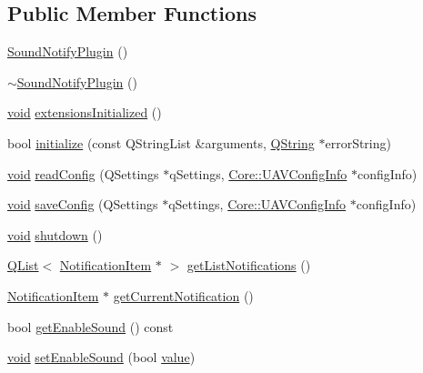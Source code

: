 \subsection*{Public Member Functions}
\begin{DoxyCompactItemize}
\item 
\hyperlink{group__notifyplugin_ga4ac47c6cde68d633ead0764296f9a737}{Sound\-Notify\-Plugin} ()
\item 
\hyperlink{group__notifyplugin_ga41104bb06fbf94801a798514294d39c3}{$\sim$\-Sound\-Notify\-Plugin} ()
\item 
\hyperlink{group___u_a_v_objects_plugin_ga444cf2ff3f0ecbe028adce838d373f5c}{void} \hyperlink{group__notifyplugin_gad704ab0c43392e54f01882f7883f689f}{extensions\-Initialized} ()
\item 
bool \hyperlink{group__notifyplugin_ga5c84bbeb8237b65ecce93f518a26384d}{initialize} (const Q\-String\-List \&arguments, \hyperlink{group___u_a_v_objects_plugin_gab9d252f49c333c94a72f97ce3105a32d}{Q\-String} $\ast$error\-String)
\item 
\hyperlink{group___u_a_v_objects_plugin_ga444cf2ff3f0ecbe028adce838d373f5c}{void} \hyperlink{group__notifyplugin_gae783274f70106d7f8a50f51b4d98221f}{read\-Config} (Q\-Settings $\ast$q\-Settings, \hyperlink{class_core_1_1_u_a_v_config_info}{Core\-::\-U\-A\-V\-Config\-Info} $\ast$config\-Info)
\item 
\hyperlink{group___u_a_v_objects_plugin_ga444cf2ff3f0ecbe028adce838d373f5c}{void} \hyperlink{group__notifyplugin_ga591d270cfaee4d5107899bf24ac83289}{save\-Config} (Q\-Settings $\ast$q\-Settings, \hyperlink{class_core_1_1_u_a_v_config_info}{Core\-::\-U\-A\-V\-Config\-Info} $\ast$config\-Info)
\item 
\hyperlink{group___u_a_v_objects_plugin_ga444cf2ff3f0ecbe028adce838d373f5c}{void} \hyperlink{group__notifyplugin_ga2f91d9771233415fa6d23a8087331df9}{shutdown} ()
\item 
\hyperlink{class_q_list}{Q\-List}$<$ \hyperlink{class_notification_item}{Notification\-Item} $\ast$ $>$ \hyperlink{group__notifyplugin_ga949c06b617fbadfd2c844d9f29351085}{get\-List\-Notifications} ()
\item 
\hyperlink{class_notification_item}{Notification\-Item} $\ast$ \hyperlink{group__notifyplugin_ga286a323009d17d90a51abfbc288bdc68}{get\-Current\-Notification} ()
\item 
bool \hyperlink{group__notifyplugin_ga25e91be7ff9c99dcb12a2e0931cec530}{get\-Enable\-Sound} () const 
\item 
\hyperlink{group___u_a_v_objects_plugin_ga444cf2ff3f0ecbe028adce838d373f5c}{void} \hyperlink{group__notifyplugin_ga25cf9833d9cea621e4168a81ee0e9d05}{set\-Enable\-Sound} (bool \hyperlink{glext_8h_aa0e2e9cea7f208d28acda0480144beb0}{value})
\end{DoxyCompactItemize}



